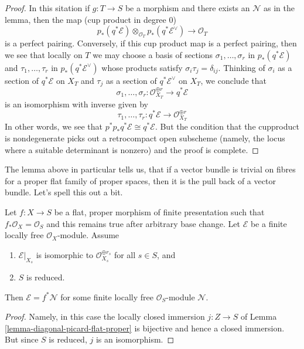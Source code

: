 \begin{proof}
\medskip\noindent
In this sitation if $g : T \to S$ be a morphism and there exists an
$\mathcal{N}$ as in the lemma, then the map (cup product in degree $0$)
$$
p_*(q^*\mathcal{E})
\otimes_{\mathcal{O}_T}
p_*(q^*\mathcal{E}^\vee)
\longrightarrow \mathcal{O}_T
$$
is a perfect pairing. Conversely, if this cup product map is a
perfect pairing, then we see that locally on $T$ we may choose a
basis of sections
$\sigma_1, \ldots, \sigma_r$ in $p_*(q^*\mathcal{E})$
and $\tau_1, \ldots, \tau_r$ in $p_*(q^*\mathcal{E}^\vee)$
whose products satisfy $\sigma_i \tau_j = \delta_{ij}$.
Thinking of $\sigma_i$ as a section of $q^*\mathcal{E}$ on $X_T$
and $\tau_j$ as a section of $q^*\mathcal{E}^\vee$ on $X_T$,
we conclude that
$$
\sigma_1, \ldots, \sigma_r :
\mathcal{O}_{X_T}^{\oplus r}
\longrightarrow
q^*\mathcal{E}
$$
is an isomorphism with inverse given by
$$
\tau_1, \ldots, \tau_r :
q^*\mathcal{E}
\longrightarrow
\mathcal{O}_{X_T}^{\oplus r}
$$
In other words, we see that $p^*p_*q^*\mathcal{E} \cong q^*\mathcal{E}$.
But the condition that the cupproduct is nondegenerate picks
out a retrocompact open subscheme (namely, the locus where a suitable
determinant is nonzero) and the proof is complete.
\end{proof}

\noindent
The lemma above in particular tells us, that if a vector bundle is
trivial on fibres for a proper flat family of proper spaces, then
it is the pull back of a vector bundle. Let's spell this out a bit.

\begin{lemma}
\label{lemma-trivial-on-fibres}
Let $f : X \to S$ be a flat, proper morphism of finite presentation
such that $f_*\mathcal{O}_X = \mathcal{O}_S$ and this remains
true after arbitrary base change. Let $\mathcal{E}$ be a finite
locally free $\mathcal{O}_X$-module. Assume
\begin{enumerate}
\item $\mathcal{E}|_{X_s}$ is isomorphic to
$\mathcal{O}_{X_s}^{\oplus r_s}$ for all $s \in S$, and
\item $S$ is reduced.
\end{enumerate}
Then $\mathcal{E} = f^*\mathcal{N}$ for some finite locally free
$\mathcal{O}_S$-module $\mathcal{N}$.
\end{lemma}

\begin{proof}
Namely, in this case the locally closed immersion $j : Z \to S$ of
Lemma \ref{lemma-diagonal-picard-flat-proper}
is bijective and hence a
closed immersion. But since $S$ is reduced, $j$ is an isomorphism.
\end{proof}

